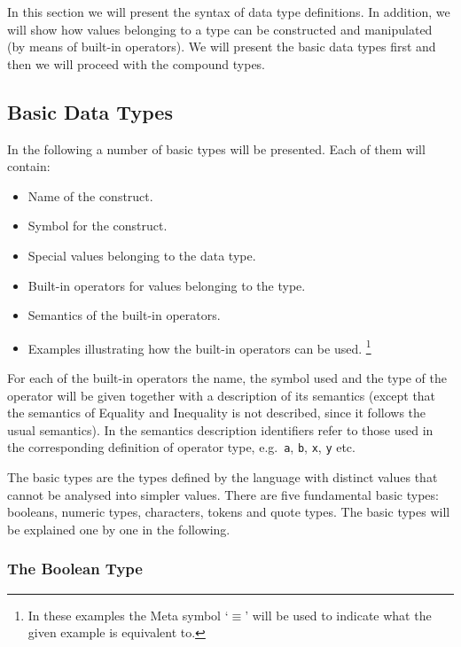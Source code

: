 \documentclass[\pformat,12pt]{article}
\begin{document}
In this section we will present the syntax of data type
definitions. In addition, we will show how values belonging to a type
can be constructed and manipulated (by means of built-in operators).
We will present the basic data types first and then we will proceed
with the compound types.

\subsection{Basic Data Types}

In the following a number of basic types will be presented. Each of
them will contain:

\begin{itemize}
\item Name of the construct.
\item Symbol for the construct.
\item Special values belonging to the data type.
\item Built-in operators for values belonging to the type.
\item Semantics of the built-in operators.
\item Examples illustrating how the built-in operators can be used.%
  \footnote{In these examples the Meta symbol `$\equiv$' will be used
    to indicate what the given example is equivalent to.}
\end{itemize}
For each of the built-in operators the name, the symbol used and the
type of the operator will be given together with a description of its
semantics (except that the semantics of Equality and Inequality is not
described, since it follows the usual semantics). In the semantics
description identifiers refer to those used in the corresponding
definition of operator type, e.g.\ {\tt a}, {\tt b}, {\tt x}, {\tt y}
etc.

The basic types are the types defined by the language with distinct
values that cannot be analysed into simpler values. There are five
fundamental basic types: booleans, numeric types,
characters, tokens and quote types. The basic types will be explained one by
one in the following.

\subsubsection{The Boolean Type}\label{bool}
\end{document}
